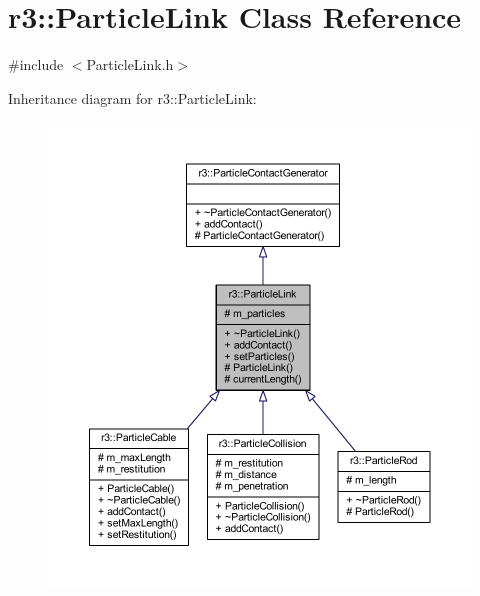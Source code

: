 \hypertarget{classr3_1_1_particle_link}{}\section{r3\+:\+:Particle\+Link Class Reference}
\label{classr3_1_1_particle_link}


{\ttfamily \#include $<$Particle\+Link.\+h$>$}



Inheritance diagram for r3\+:\+:Particle\+Link\+:\nopagebreak
\begin{figure}[H]
\begin{center}
\leavevmode
\includegraphics[width=350pt]{classr3_1_1_particle_link__inherit__graph}
\end{center}
\end{figure}


